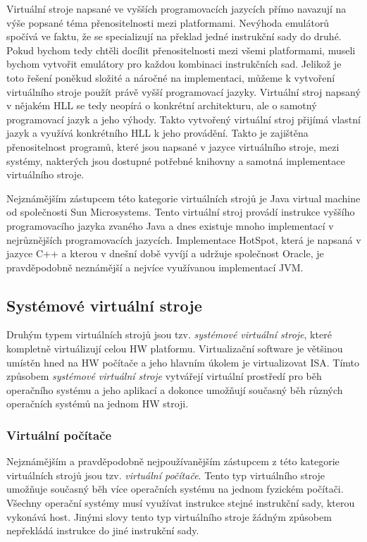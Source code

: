     Virtuální stroje napsané ve vyšších programovacích jazycích přímo navazují na výše popsané téma přenositelnosti mezi platformami. Nevýhoda emulátorů spočívá ve faktu, že se specializují na překlad jedné instrukční sady
    do druhé. Pokud bychom tedy chtěli docílit přenositelnosti mezi všemi platformami, museli bychom vytvořit emulátory pro každou kombinaci instrukčních sad. Jelikož je toto řešení poněkud složité a náročné na
    implementaci, můžeme k vytvoření virtuálního stroje použít právě vyšší programovací jazyky. Virtuální stroj napsaný v nějakém HLL se tedy neopírá o konkrétní architekturu, ale o samotný programovací jazyk a jeho výhody.
    Takto vytvořený virtuální stroj přijímá vlastní jazyk a využívá konkrétního HLL k jeho provádění. Takto je zajištěna přenositelnost programů, které jsou napsané v jazyce virtuálního stroje, mezi systémy, nakterých jsou dostupné
    potřebné knihovny a samotná implementace virtuálního stroje.
    
    Nejznámějším zástupcem této kategorie virtuálních strojů je Java virtual machine od společnosti Sun Microsystems. Tento virtuální stroj provádí instrukce vyššího programovacího jazyka zvaného Java a dnes existuje mnoho
    implementací v nejrůznějších programovacích jazycích. Implementace HotSpot, která je napsaná v jazyce C++ a kterou v dnešní době vyvíjí a udržuje společnost Oracle, je pravděpodobně neznámější a nejvíce využívanou
    implementací JVM.
    
  \subsection{Systémové virtuální stroje}
  \label{subsection:system_vm}
  
  Druhým typem virtuálních strojů jsou tzv. \textit{systémové virtuální stroje}, které kompletně virtuálizují celou HW platformu. Virtualizační software je většinou umístěn hned na HW počítače a jeho hlavním úkolem je
  virtualizovat ISA. Tímto způsobem \textit{systémové virtuální stroje} vytvářejí virtuální prostředí pro běh operačního systému a jeho aplikací a dokonce umožňují současný běh různých operačních systémů na jednom HW stroji.
  
    \subsubsection*{Virtuální počítače}
    \label{subsubsection:virtual_computer}
    
    Nejznámějším a pravděpodobně nejpoužívanějším zástupcem z této kategorie virtuálních strojů jsou tzv. \textit{virtuální počítače}. Tento typ virtuálního stroje umožňuje současný běh více operačních systému na jednom
    fyzickém počítači. Všechny operační systémy musí využívat instrukce stejné instrukční sady, kterou vykonává host. Jinými slovy tento typ virtuálního stroje žádným způsobem nepřekládá instrukce do jiné instrukční sady.
    
